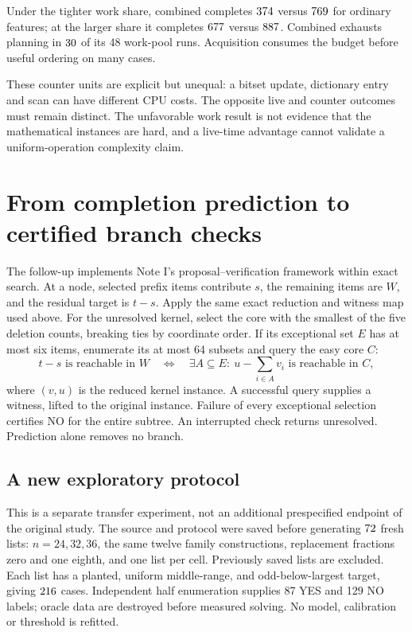 \documentclass[10pt,english]{article}
\begin{document}
Under the tighter work share, combined completes \(374\) versus \(769\) for ordinary features; at the larger share it completes \(677\) versus \(887\). Combined exhausts planning in \(30\) of its 48 work-pool runs. Acquisition consumes the budget before useful ordering on many cases.

These counter units are explicit but unequal: a bitset update, dictionary entry and scan can have different CPU costs. The opposite live and counter outcomes must remain distinct. The unfavorable work result is not evidence that the mathematical instances are hard, and a live-time advantage cannot validate a uniform-operation complexity claim.

\section{From completion prediction to certified branch checks}
The follow-up implements Note I's proposal--verification framework within exact search. At a node, selected prefix items contribute \(s\), the remaining items are \(W\), and the residual target is \(t-s\). Apply the same exact reduction and witness map used above. For the unresolved kernel, select the core with the smallest of the five deletion counts, breaking ties by coordinate order. If its exceptional set \(E\) has at most six items, enumerate its at most 64 subsets and query the easy core \(C\):
\[
t-s\text{ is reachable in }W
\quad\Longleftrightarrow\quad
\exists A\subseteq E:\ u-\textstyle\sum_{i\in A}v_i
\text{ is reachable in }C,
\]
where \((v,u)\) is the reduced kernel instance. A successful query supplies a witness, lifted to the original instance. Failure of every exceptional selection certifies NO for the entire subtree. An interrupted check returns unresolved. Prediction alone removes no branch.

\subsection{A new exploratory protocol}
This is a separate transfer experiment, not an additional prespecified endpoint of the original study. The source and protocol were saved before generating \(72\) fresh lists: \(n=24,32,36\), the same twelve family constructions, replacement fractions zero and one eighth, and one list per cell. Previously saved lists are excluded. Each list has a planted, uniform middle-range, and odd-below-largest target, giving \(216\) cases. Independent half enumeration supplies 87 YES and 129 NO labels; oracle data are destroyed before measured solving. No model, calibration or threshold is refitted.
\end{document}
